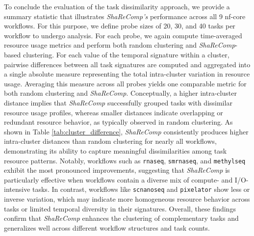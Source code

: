 To conclude the evaluation of the task dissimilarity approach, we provide a summary statistic that illustrates \textit{ShaReComp's} performance across all 9 nf-core workflows. For this purpose, we define probe sizes of 20, 30, and 40 tasks per workflow to undergo analysis. For each probe, we again compute time-averaged resource usage metrics and perform both random clustering and \textit{ShaReComp}-based clustering.
For each value of the temporal signature within a cluster, pairwise differences between all task signatures are computed and aggregated into a single absolute measure representing the total intra-cluster variation in resource usage. Averaging this measure across all probes yields one comparable metric for both random clustering and \textit{ShaReComp}. Conceptually, a higher intra-cluster distance implies that \textit{ShaReComp} successfully grouped tasks with dissimilar resource usage profiles, whereas smaller distances indicate overlapping or redundant resource behavior, as typically observed in random clustering.
As shown in Table \ref{tab:cluster_difference}, \textit{ShaReComp} consistently produces higher intra-cluster distances than random clustering for nearly all workflows, demonstrating its ability to capture meaningful dissimilarities among task resource patterns. Notably, workflows such as \texttt{rnaseq}, \texttt{smrnaseq}, and \texttt{methylseq} exhibit the most pronounced improvements, suggesting that \textit{ShaReComp} is particularly effective when workflows contain a diverse mix of compute- and I/O-intensive tasks. In contrast, workflows like \texttt{scnanoseq} and \texttt{pixelator} show less or inverse variation, which may indicate more homogeneous resource behavior across tasks or limited temporal diversity in their signatures. Overall, these findings confirm that \textit{ShaReComp} enhances the clustering of complementary tasks and generalizes well across different workflow structures and task counts.

